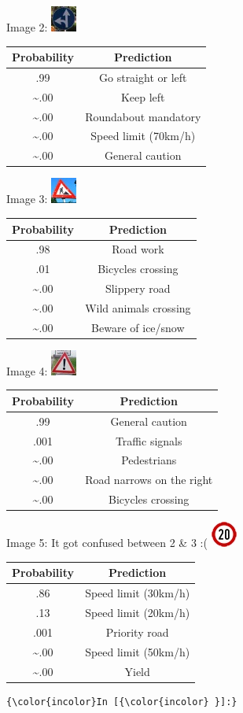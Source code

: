 \documentclass[11pt]{article}
\makeatletter
\def\maxwidth{\ifdim\Gin@nat@width>\linewidth\linewidth
    \else\Gin@nat@width\fi}
\let\Oldincludegraphics\includegraphics
\renewcommand{\includegraphics}[1]{\Oldincludegraphics[width=.8\maxwidth]{#1}}
\makeatother
\begin{document}
Image 2: \includegraphics{./private/37-1.jpg}

\begin{longtable}[]{@{}cc@{}}
\toprule
Probability & Prediction\tabularnewline
\midrule
\endhead
.99 & Go straight or left\tabularnewline
\textasciitilde{}.00 & Keep left\tabularnewline
\textasciitilde{}.00 & Roundabout mandatory\tabularnewline
\textasciitilde{}.00 & Speed limit (70km/h)\tabularnewline
\textasciitilde{}.00 & General caution\tabularnewline
\bottomrule
\end{longtable}

Image 3: \includegraphics{./private/25-1.jpg}

\begin{longtable}[]{@{}cc@{}}
\toprule
Probability & Prediction\tabularnewline
\midrule
\endhead
.98 & Road work\tabularnewline
.01 & Bicycles crossing\tabularnewline
\textasciitilde{}.00 & Slippery road\tabularnewline
\textasciitilde{}.00 & Wild animals crossing\tabularnewline
\textasciitilde{}.00 & Beware of ice/snow\tabularnewline
\bottomrule
\end{longtable}

Image 4: \includegraphics{./private/18-1.jpg}

\begin{longtable}[]{@{}cc@{}}
\toprule
Probability & Prediction\tabularnewline
\midrule
\endhead
.99 & General caution\tabularnewline
.001 & Traffic signals\tabularnewline
\textasciitilde{}.00 & Pedestrians\tabularnewline
\textasciitilde{}.00 & Road narrows on the right\tabularnewline
\textasciitilde{}.00 & Bicycles crossing\tabularnewline
\bottomrule
\end{longtable}

Image 5: It got confused between 2 \& 3 :(
\includegraphics{./private/0-1.jpg}

\begin{longtable}[]{@{}cc@{}}
\toprule
Probability & Prediction\tabularnewline
\midrule
\endhead
.86 & Speed limit (30km/h)\tabularnewline
.13 & Speed limit (20km/h)\tabularnewline
.001 & Priority road\tabularnewline
\textasciitilde{}.00 & Speed limit (50km/h)\tabularnewline
\textasciitilde{}.00 & Yield\tabularnewline
\bottomrule
\end{longtable}

    \begin{Verbatim}[commandchars=\\\{\}]
{\color{incolor}In [{\color{incolor} }]:} 
\end{Verbatim}


    
    
    
    
\end{document}
